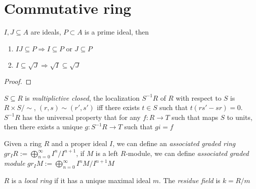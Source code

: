 \documentclass[main]{subfiles}
\begin{document}
\tableofcontents
\newpage

\section{Commutative ring}

\begin{proposition}
$I,J\subseteq A$ are ideals, $P\subset A$ is a prime ideal, then
\begin{enumerate}
\item $IJ\subseteq P\Rightarrow I\subseteq P$ or $J\subseteq P$
\item $I\subseteq \sqrt J\Rightarrow\sqrt I\subseteq\sqrt J$
\end{enumerate}
\end{proposition}

\begin{proof}

\end{proof}

\begin{definition}
$S\subseteq R$ is \textit{multiplictive closed}, the localization $S^{-1}R$ of $R$ with respect to $S$ is $R\times S/\sim$, $(r,s)\sim(r',s')$ iff there exists $t\in S$ such that $t(rs'-sr)=0$. $S^{-1}R$ has the universal property that for any $f:R\to T$ such that maps $S$ to units, then there exists a unique $g:S^{-1}R\to T$ such that $gi=f$
\begin{center}
\end{center}
\end{definition}

\begin{definition}
Given a ring $R$ and a proper ideal $I$, we can define an \textit{associated graded ring} $\displaystyle gr_IR:=\bigoplus_{n=0}^\infty I^n/I^{n+1}$, if $M$ is a left $R$-module, we can define \textit{associated graded module} $\displaystyle gr_IM:=\bigoplus_{n=0}^\infty I^nM/I^{n+1}M$
\end{definition}

\begin{definition}
$R$ is a \textit{local ring} if it has a unique maximal ideal $m$. The \textit{residue field} is $k=R/m$
\end{definition}
\end{document}
